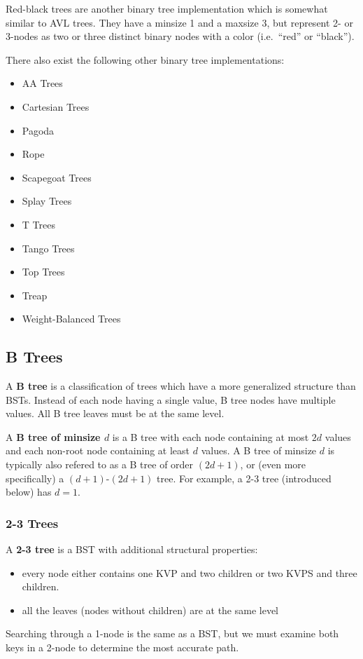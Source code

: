 \documentclass[12pt]{article}
\begin{document}
Red-black trees are another binary tree implementation which is somewhat similar to AVL trees. They have a minsize 1 and a maxsize 3, but represent 2- or 3-nodes as two or three distinct binary nodes with a color (i.e.\ ``red'' or ``black'').

There also exist the following other binary tree implementations:
\begin{itemize}
\item AA Trees
\item Cartesian Trees
\item Pagoda
\item Rope
\item Scapegoat Trees
\item Splay Trees
\item T Trees
\item Tango Trees
\item Top Trees
\item Treap
\item Weight-Balanced Trees
\end{itemize}

\subsection{B Trees}
A {\bf B tree} is a classification of trees which have a more generalized structure than BSTs. Instead of each node having a single value, B tree nodes have multiple values. All B tree leaves must be at the same level.

A {\bf B tree of minsize $d$} is a B tree with each node containing at most $2d$ values and each non-root node containing at least $d$ values. A B tree of minsize $d$ is typically also refered to as a B tree of order $(2d+1)$, or (even more specifically) a $(d+1)$-$(2d+1)$ tree. For example, a 2-3 tree (introduced below) has $d = 1$.

\subsubsection{2-3 Trees}
A {\bf 2-3 tree} is a BST with additional structural properties:
\begin{itemize}
\item every node either contains one KVP and two children or two KVPS and three children.
\item all the leaves (nodes without children) are at the same level
\end{itemize}

Searching through a 1-node is the same as a BST, but we must examine both keys in a 2-node to determine the most accurate path.
\end{document}
